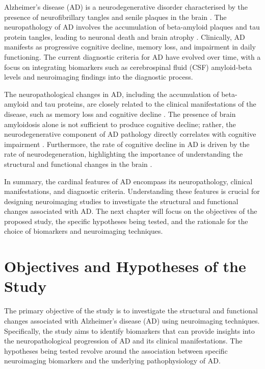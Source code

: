 \documentclass[10pt]{article}
\begin{document}
\begin{sloppypar}
  Alzheimer's disease (AD) is a neurodegenerative disorder characterised by the presence of neurofibrillary tangles and senile plaques in the brain \citep{petersen_alzheimers_2009}. The neuropathology of AD involves the accumulation of beta-amyloid plaques and tau protein tangles, leading to neuronal death and brain atrophy \citep{petersen_alzheimers_2009}. Clinically, AD manifests as progressive cognitive decline, memory loss, and impairment in daily functioning. The current diagnostic criteria for AD have evolved over time, with a focus on integrating biomarkers such as cerebrospinal fluid (CSF) amyloid-beta levels and neuroimaging findings into the diagnostic process.

  The neuropathological changes in AD, including the accumulation of beta-amyloid and tau proteins, are closely related to the clinical manifestations of the disease, such as memory loss and cognitive decline \citep{jack_serial_2009}. The presence of brain amyloidosis alone is not sufficient to produce cognitive decline; rather, the neurodegenerative component of AD pathology directly correlates with cognitive impairment \citep{jack_serial_2009}. Furthermore, the rate of cognitive decline in AD is driven by the rate of neurodegeneration, highlighting the importance of understanding the structural and functional changes in the brain \citep{jack_serial_2009}.

  In summary, the cardinal features of AD encompass its neuropathology, clinical manifestations, and diagnostic criteria. Understanding these features is crucial for designing neuroimaging studies to investigate the structural and functional changes associated with AD. The next chapter will focus on the objectives of the proposed study, the specific hypotheses being tested, and the rationale for the choice of biomarkers and neuroimaging techniques.

  \section{Objectives and Hypotheses of the Study}
  \label{sec:objectives-and-hypotheses}

  The primary objective of the study is to investigate the structural and functional changes associated with Alzheimer's disease (AD) using neuroimaging techniques. Specifically, the study aims to identify biomarkers that can provide insights into the neuropathological progression of AD and its clinical manifestations. The hypotheses being tested revolve around the association between specific neuroimaging biomarkers and the underlying pathophysiology of AD.


\end{sloppypar}
\end{document}
